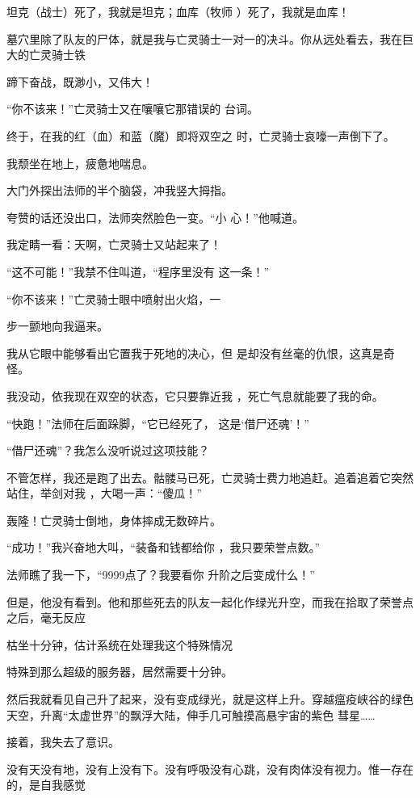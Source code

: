 \documentclass{article}
\begin{document}
坦克（战士）死了，我就是坦克；血库（牧师
）死了，我就是血库！ 

墓穴里除了队友的尸体，就是我与亡灵骑士一对一的决斗。你从远处看去，我在巨大的亡灵骑士铁

\newpage
蹄下奋战，既渺小，又伟大！ 

“你不该来！”亡灵骑士又在嚷嚷它那错误的
台词。 

终于，在我的红（血）和蓝（魔）即将双空之
时，亡灵骑士哀嚎一声倒下了。 


我颓坐在地上，疲惫地喘息。 

大门外探出法师的半个脑袋，冲我竖大拇指。

夸赞的话还没出口，法师突然脸色一变。“小
心！”他喊道。 


我定睛一看：天啊，亡灵骑士又站起来了！ 

“这不可能！”我禁不住叫道，“程序里没有
这一条！” 

“你不该来！”亡灵骑士眼中喷射出火焰，一

\newpage
步一颤地向我逼来。 

我从它眼中能够看出它置我于死地的决心，但
是却没有丝毫的仇恨，这真是奇怪。 

我没动，依我现在双空的状态，它只要靠近我
，死亡气息就能要了我的命。 

“快跑！”法师在后面跺脚，“它已经死了，
这是‘借尸还魂’！” 


“借尸还魂”？我怎么没听说过这项技能？ 

不管怎样，我还是跑了出去。骷髅马已死，亡灵骑士费力地追赶。追着追着它突然站住，举剑对我
，大喝一声：“傻瓜！” 


轰隆！亡灵骑士倒地，身体摔成无数碎片。 

“成功！”我兴奋地大叫，“装备和钱都给你
，我只要荣誉点数。” 

\newpage

法师瞧了我一下，“9999点了？我要看你
升阶之后变成什么！” 

但是，他没有看到。他和那些死去的队友一起化作绿光升空，而我在拾取了荣誉点之后，毫无反应

枯坐十分钟，估计系统在处理我这个特殊情况

特殊到那么超级的服务器，居然需要十分钟。

然后我就看见自己升了起来，没有变成绿光，就是这样上升。穿越瘟疫峡谷的绿色天空，升离“太虚世界”的飘浮大陆，伸手几可触摸高悬宇宙的紫色
彗星…… 


接着，我失去了意识。 

没有天没有地，没有上没有下。没有呼吸没有心跳，没有肉体没有视力。惟一存在的，是自我感觉
\end{document}
